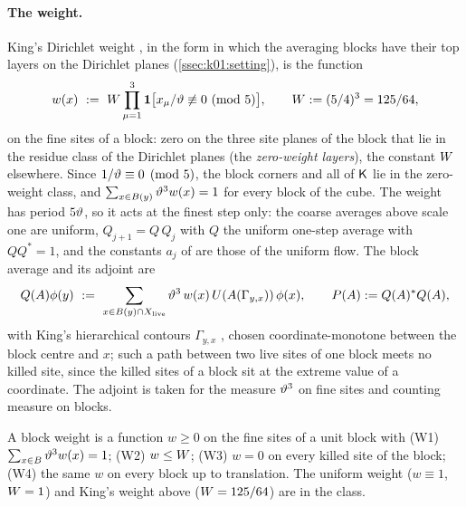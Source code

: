 \paragraph{The weight.} King's Dirichlet weight \cite[(3.8)--(3.9)]{K2}, in the form in which the averaging blocks have their top layers on the Dirichlet planes (\cref{ssec:k01:setting}), is the function
\[
w(x)\ \defeq\ \Wt\prod_{\mu=1}^{3}\mathbf 1\big[x_\mu/\vth\not\equiv0\ (\mathrm{mod}\ 5)\big],\qquad \Wt\defeq(5/4)^3=125/64,
\]
on the fine sites of a block: zero on the three site planes of the block that lie in the residue class of the Dirichlet planes (the \emph{zero-weight layers}), the constant $W$ elsewhere. Since $1/\vartheta\equiv0\pmod5$, the block corners and all of $\mathsf K$ lie in the zero-weight class, and $\sum_{x\in B(y)}\vartheta^3w(x)=1$ for every block of the cube. The weight has period $5\vartheta$, so it acts at the finest step only: the coarse averages above scale one are uniform, $Q_{j+1}=Q\,Q_j$ with $Q$ the uniform one-step average with $QQ^*=1$, and the constants $a_j$ of \cite[(2.13)]{K1} are those of the uniform flow. The block average and its adjoint are
\[
Q(A)\phi(y)\ :=\ \sum_{x\in B(y)\cap X_{\mathrm{live}}}\vartheta^3\,w(x)\,U(A(\Gamma_{y,x}))\,\phi(x),\qquad P(A):= Q(A)^*Q(A),
\]
with King's hierarchical contours $\Gamma_{y,x}$ \cite[(2.10)--(2.12)]{K1}, chosen coordinate-monotone between the block centre and $x$; such a path between two live sites of one block meets no killed site, since the killed sites of a block sit at the extreme value of a coordinate. The adjoint is taken for the measure $\vartheta^3$ on fine sites and counting measure on blocks.

\begin{definition}\label{def:a01:wclass}
A block weight is a function $w\ge0$ on the fine sites of a unit block with (W1) $\sum_{x\in B}\vartheta^3w(x)=1$; (W2) $w\le W$; (W3) $w=0$ on every killed site of the block; (W4) the same $w$ on every block up to translation. The uniform weight ($w\equiv1$, $W=1$) and King's weight above ($W=125/64$) are in the class.
\end{definition}

